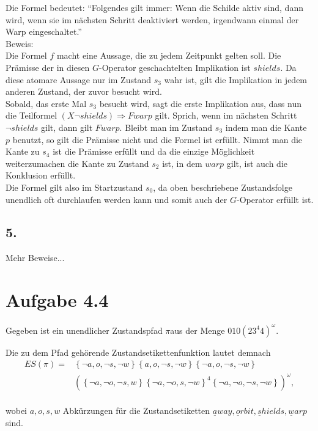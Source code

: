 \documentclass[12pt, paper=a4]{article}
\begin{document}
Die Formel bedeutet: ``Folgendes gilt immer: Wenn die Schilde aktiv sind, dann wird, wenn sie im nächsten Schritt deaktiviert werden, irgendwann einmal der Warp eingeschaltet.''\\

Beweis:\\
Die Formel $f$ macht eine Aussage, die zu jedem Zeitpunkt gelten soll. Die Prämisse der in diesen $G$-Operator geschachtelten Implikation ist $shields$. Da diese atomare Aussage nur im Zustand $s_3$ wahr ist, gilt die Implikation in jedem anderen Zustand, der zuvor besucht wird.\\
Sobald, das erste Mal $s_3$ besucht wird, sagt die erste Implikation aus, dass nun die Teilformel $(X \neg shields) \Rightarrow F warp$ gilt. Sprich, wenn im nächsten Schritt $\neg shields$ gilt, dann gilt $F warp$. Bleibt man im Zustand $s_3$ indem man die Kante $p$ benutzt, so gilt die Prämisse nicht und die Formel ist erfüllt. Nimmt man die Kante zu $s_4$ ist die Prämisse erfüllt und da die einzige Möglichkeit weiterzumachen die Kante zu Zustand $s_2$ ist, in dem $warp$ gilt, ist auch die Konklusion erfüllt.\\
Die Formel gilt also im Startzustand $s_0$, da oben beschriebene Zustandsfolge unendlich oft durchlaufen werden kann und somit auch der $G$-Operator erfüllt ist.\\

\subsection*{5.}
Mehr Beweise...\\

\section*{Aufgabe 4.4}
Gegeben ist ein unendlicher Zustandspfad $\pi$aus der Menge $010\left(23^{4}4\right)^{\omega}$.

Die zu dem Pfad gehörende Zustandsetikettenfunktion lautet demnach\\
\begin{align*}
ES\left(\pi\right)=&\left\{ \neg a,o,\neg s,\neg w\right\} \left\{ a,o,\neg s,\neg w\right\} \left\{ \neg a,o,\neg s,\neg w\right\} \\
 & \left(\left\{ \neg a,\neg o,\neg s,w\right\} \left\{ \neg a,\neg o,s,\neg w\right\} ^{4}\left\{ \neg a,\neg o,\neg s,\neg w\right\} \right)^{\omega},
  \end{align*}
\\
wobei $a,o,s,w$ Abkürzungen für die Zustandsetiketten $\underline{a}way,\underline{o}rbit,\underline{s}hields,\underline{w}arp$
sind.\\
\end{document}
